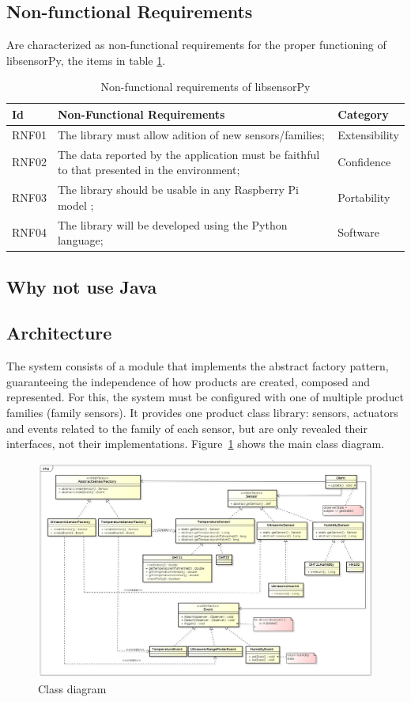 \documentclass{acm_proc_article-sp}
\begin{document}
\subsection{Non-functional Requirements}
Are characterized as non-functional requirements for the proper functioning of libsensorPy, the items in table \ref{table:rnf}.

\begin{table}[h]
 \caption{Non-functional requirements of libsensorPy}
 \label{table:rnf}
 \begin{tabular}{|l|p{4.7cm}|l|}
 \hline  
 Id & Non-Functional Requirements & Category \\
 \hline  
 RNF01 & The library must allow adition of new sensors/families; & Extensibility\\
 \hline  
 RNF02 & The data reported by the application must be faithful to that presented in the environment; & Confidence \\
 \hline 
 RNF03 & The library should be usable in any Raspberry Pi model ; & Portability \\
 \hline 
 RNF04 & The library will be developed using the Python language; & Software \\
\hline  
\end{tabular}
\end{table}
\subsection{Why not use Java}

\subsection{Architecture}
The system consists of a module that implements the abstract factory pattern, guaranteeing the independence of how products are created, composed and represented. For this, the system must be configured with one of multiple product families (family sensors). It provides one product class library: sensors, actuators and events related to the family of each sensor, but are only revealed their interfaces, not their implementations. Figure~\ref{fig:classDiagram} shows the main class diagram.
\begin{figure}[ht]
    \includegraphics[width=1.0\textwidth,natwidth=610,natheight=642]{pictures/ClassDiagram.png}
    \caption{Class diagram}
    \label{fig:classDiagram}
\end{figure}
\end{document}
